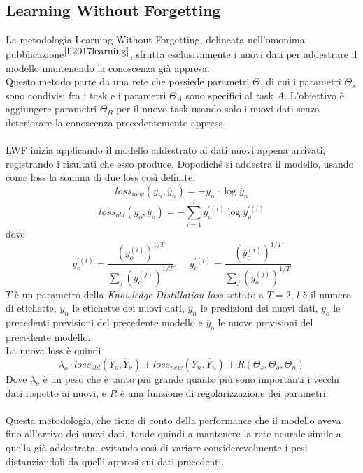 \subsection{Learning Without Forgetting}
La metodologia Learning Without Forgetting, delineata nell'omonima pubblicazione$^{\cite{li2017learning}}$, sfrutta esclusivamente i nuovi dati per addestrare il modello mantenendo la conoscenza già appresa.\\
Questo metodo parte da una rete che possiede parametri $\Theta$, di cui i parametri $\Theta_s$ sono condivisi fra i task e i parametri $\Theta_A$ sono specifici al task $A$. L'obiettivo è aggiungere parametri $\Theta_B$ per il nuovo task usando solo i nuovi dati senza deteriorare la conoscenza precedentemente appresa.\\\\
LWF inizia applicando il modello addestrato ai dati nuovi appena arrivati, registrando i risultati che esso produce. Dopodiché si addestra il modello, usando come loss la somma di due loss così definite:
\begin{equation}\label{eq:lwf_lossnew}
    loss_{new}(y_n, \overline{y}_n) = -y_n\cdot\log\overline{y}_n
\end{equation}
\begin{equation}\label{eq:lwf_lossnew}
    loss_{old}(y_o, \overline{y}_o) = -\sum_{i=1}^l y_o^{'(i)}\log y_o^{'(i)}
\end{equation}
dove
\begin{equation}\label{eq:lwf_lossnew}
    y_o^{'(i)} = \frac{\left(y_o^{(i)}\right)^{1/T}}{\sum_j \left(y_o^{(j)}\right)^{1/T}},\:\:\:\:\:
    \overline{y}_o^{'(i)} = \frac{\left(\overline{y}_o^{(i)}\right)^{1/T}}{\sum_j \left(\overline{y}_o^{(j)}\right)^{1/T}}
\end{equation}
$T$ è un parametro della \textit{Knowledge Distillation loss} settato a $T = 2$, $l$ è il numero di etichette, $y_n$ le etichette dei nuovi dati, $\overline{y}_n$ le predizioni dei nuovi dati, $y_o$ le precedenti previsioni del precedente modello e $\overline{y}_o$ le nuove previsioni del precedente modello.\\
La nuova loss è quindi
\begin{equation}\label{eq:lwf_loss}
    \lambda_o\cdot loss_{old}(Y_o, \overline{Y}_o) + loss_{new}(Y_n, \overline{Y}_n) + R(\Theta_s, \Theta_o, \Theta_n)
\end{equation}
Dove $\lambda_o$ è un peso che è tanto più grande quanto più sono importanti i vecchi dati rispetto ai nuovi, e $R$ è una funzione di regolarizzazione dei parametri.\\\\
Questa metodologia, che tiene di conto della performance che il modello aveva fino all'arrivo dei nuovi dati, tende quindi a mantenere la rete neurale simile a quella già addestrata, evitando così di variare considerevolmente i pesi distanziandoli da quelli appresi sui dati precedenti.
